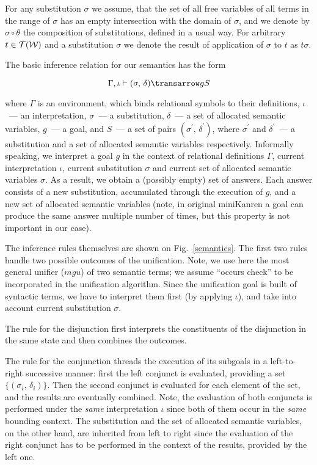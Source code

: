 For any substitution $\sigma$ we assume, that the set of all free variables of all terms in the range of $\sigma$ has an empty intersection with the
domain of $\sigma$, and we denote by $\sigma\circ\theta$ the composition of substitutions, defined in a usual way. For arbitrary $t\in{\cal{T}}({\cal{W}})$ and
a substitution $\sigma$ we denote the result of application of $\sigma$ to $t$ as $t\sigma$.

The basic inference relation for our semantics has the form

$$
\otrans{\Gamma,\iota}{(\sigma,\,\delta)}{g}{S}
$$

\noindent where $\Gamma$ is an environment, which binds relational symbols to their definitions, $\iota$~--- an interpretation, $\sigma$~--- a substitution, 
$\delta$~--- a set of allocated semantic variables, $g$~--- a goal, and $S$~--- a set of pairs $(\sigma^\prime,\,\delta^\prime)$, where $\sigma^\prime$ and
$\delta^\prime$~--- a substitution and a set of allocated semantic variables respectively. Informally speaking, we interpret a goal $g$ in the context of
relational definitions $\Gamma$, current interpretation $\iota$, current substitution $\sigma$ and current set of allocated semantic variables $\sigma$. As a 
result, we obtain a (possibly empty) set of answers. Each answer consists of a new substitution, accumulated through the execution of $g$, and a new set of
allocated semantic variables (note, in original miniKanren a goal can produce the same answer multiple number of times, but this property is not important
in our case).

The inference rules themselves are shown on Fig.~\ref{semantics}. The first two rules handle two possible outcomes of the unification. Note, we use here the most 
general unifier ($mgu$) of two semantic terms; we assume ``occurs check'' to be incorporated in the unification algorithm. Since the unification goal is built of 
syntactic terms, we have to interpret them first (by applying $\iota$), and take into account current substitution $\sigma$.

The rule for the disjunction first interprets the constituents of the disjunction in the same state and then combines the outcomes.

The rule for the conjunction threads the execution of its subgoals in a left-to-right successive manner: first the
left conjunct is evaluated, providing a set $\{(\sigma_i,\,\delta_i)\}$. Then the second conjunct is evaluated for each element of the set, and the
results are eventually combined. Note, the evaluation of both conjuncts is performed under the \emph{same} interpretation $\iota$ since both of them occur in the 
\emph{same} bounding context. The substitution and the set of allocated semantic variables, on the other hand, are inherited from left to right since the evaluation 
of the right conjunct has to be performed in the context of the results, provided by the left one. 

